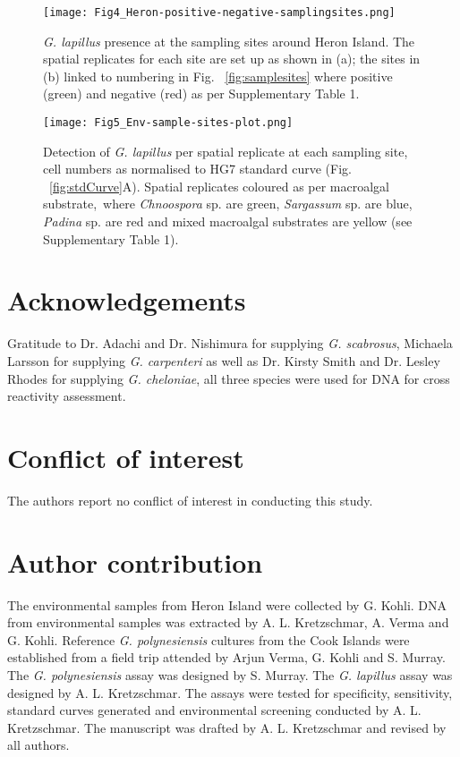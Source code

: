 \documentclass[12pt]{article}
\begin{document}
\FloatBarrier
\FloatBarrier 
\begin{figure} 
\texttt{[image: Fig4\_Heron-positive-negative-samplingsites.png]} 
\caption{\emph{G. lapillus} presence at the sampling sites around Heron Island. The spatial replicates for each site are set up as shown in (a); the sites in (b) linked to numbering in Fig. ~\ref{fig:samplesites} where positive (green) and negative (red) as per Supplementary Table 1.} 
\label{fig:envposneg}
\end{figure} 
\FloatBarrier

\begin{figure} 
\texttt{[image: Fig5\_Env-sample-sites-plot.png]} 
\caption{Detection of \emph{G. lapillus} per spatial replicate at each sampling site, cell numbers as normalised to HG7 standard curve (Fig. ~\ref{fig:stdCurve}A). Spatial replicates coloured as per macroalgal substrate,\ where \emph{Chnoospora} sp. are green, \emph{Sargassum} sp. are blue, \emph{Padina} sp. are red and mixed macroalgal substrates are yellow (see Supplementary Table 1).} 
\label{fig:envHG7}
\end{figure} 
\FloatBarrier
 \section*{Acknowledgements}
Gratitude to Dr. Adachi and Dr. Nishimura for supplying \emph{G. scabrosus}, Michaela Larsson for supplying \emph{G. carpenteri} as well as Dr. Kirsty Smith and Dr. Lesley Rhodes for supplying \emph{G. cheloniae}, all three species were used for DNA for cross reactivity assessment. 

\section*{Conflict of interest}
The authors report no conflict of interest in conducting this study.

\section*{Author contribution}
The environmental samples from Heron Island were collected by G. Kohli. DNA from environmental samples was extracted by A. L. Kretzschmar, A. Verma and G. Kohli. Reference \emph{G. polynesiensis} cultures from the Cook Islands were established from a field trip attended by Arjun Verma, G. Kohli and S. Murray. The \emph{G. polynesiensis} assay was designed by S. Murray. The \emph{G. lapillus} assay was designed by A. L. Kretzschmar. The assays were tested for specificity, sensitivity, standard curves generated and environmental screening conducted by A. L. Kretzschmar. The manuscript was drafted by A. L. Kretzschmar and revised by all authors.

\FloatBarrier
\newpage

%
%

\end{document}
